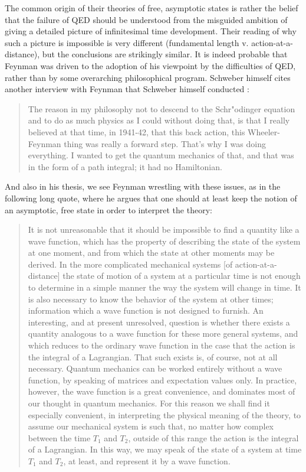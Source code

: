 \documentclass[12pt]{article}
\begin{document}
The common origin of their theories of free, asymptotic states is rather the belief that the failure of QED should be understood from the misguided ambition of giving a detailed picture of infinitesimal time development. Their reading of why such a picture is impossible is very different (fundamental length v. action-at-a-distance), but the conclusions are strikingly similar. It is indeed probable that Feynman was driven to the adoption of his viewpoint by the difficulties of QED, rather than by some overarching philosophical program. Schweber himself cites another interview with Feynman that Schweber himself conducted \citep[p. 396]{schweber_1994_qed}:

\begin{quote}
The reason in my philosophy not to descend to the Schr"odinger equation and to do as much physics as I could without doing that, is that I really believed at that time, in 1941-42, that this back action, this Wheeler-Feynman thing was really a forward step. That's why I was doing everything. I wanted to get the quantum mechanics of that, and that was in the form of a path integral; it had no Hamiltonian.
\end{quote}

And also in his thesis, we see Feynman wrestling with these issues, as in the following long quote, where he argues that one should at least keep the notion of an asymptotic, free state in order to interpret the theory:

\begin{quote}
It is not unreasonable that it should be impossible to find a quantity like a wave function, which has the property of describing the state of the system at one moment, and from which the state at other moments may be derived. In the more complicated mechanical systems [of action-at-a-distance] the state of motion of a system at a particular time is not enough to determine in a simple manner the way the system will change in time. It is also necessary to know the behavior of the system at other times; information which a wave function is not designed to furnish. An interesting, and at present unresolved, question is whether there exists a quantity analogous to a wave function for these more general systems, and which reduces to the ordinary wave function in the case that the action is the integral of a Lagrangian. That such exists is, of course, not at all necessary. Quantum mechanics can be worked entirely without a wave function, by speaking of matrices and expectation values only. In practice, however, the wave function is a great convenience, and dominates most of our thought in quantum mechanics. For this reason we shall find it especially convenient, in interpreting the physical meaning of the theory, to assume our mechanical system is such that, no matter how complex between the time $T_1$ and $T_2$, outside of this range the action is the integral of a Lagrangian. In this way, we may speak of the state of a system at time $T_1$ and $T_2$, at least, and represent it by a wave function.
\end{quote}
\end{document}
